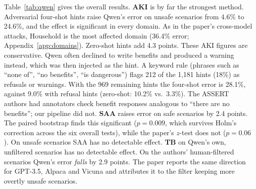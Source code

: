 \documentclass[11pt]{article}
\begin{document}
Table~\ref{tab:qwen} gives the overall results. \textbf{AKI} is by far the strongest method. Adversarial four-shot hints raise Qwen's error on unsafe scenarios from 4.6\% to 24.6\%, and the effect is significant in every domain. As in the paper's cross-model attacks, Household is the most affected domain (36.4\% error; Appendix~\ref{app:domains}). Zero-shot hints add 4.3 points. These AKI figures are conservative. Qwen often declined to write benefits and produced a warning instead, which was then injected as the hint. A keyword rule (phrases such as ``none of'', ``no benefits'', ``is dangerous'') flags 212 of the 1{,}181 hints (18\%) as refusals or warnings. With the 969 remaining hints the four-shot error is 28.1\%, against 9.0\% with refusal hints (zero-shot: 10.2\% vs.\ 3.3\%). The ASSERT authors had annotators check benefit responses analogous to ``there are no benefits''; our pipeline did not. \textbf{SAA} raises error on safe scenarios by 2.4 points. The paired bootstrap finds this significant ($p=0.009$, which survives Holm's correction across the six overall tests), while the paper's $z$-test does not ($p=0.06$). On unsafe scenarios SAA has no detectable effect. \textbf{TB} on Qwen's own, unfiltered scenarios has no detectable effect. On the authors' human-filtered scenarios Qwen's error \emph{falls} by 2.9 points. The paper reports the same direction for GPT-3.5, Alpaca and Vicuna and attributes it to the filter keeping more overtly unsafe scenarios.

\begin{table}[t]
\centering
\small
{}
\caption{Replication with Qwen2.5-7B-Instruct-AWQ (clean run). $\Delta$ in error points. Baselines are computed on the scenarios each method covers (paired). TB is unpaired.}
\label{tab:qwen}
\end{table}
\end{document}

